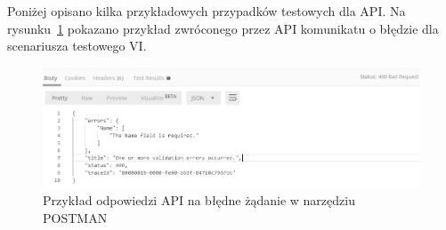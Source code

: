 Poniżej opisano kilka przykładowych przypadków testowych dla API. Na rysunku~\ref{fig:api-test-1} pokazano przykład zwróconego przez API komunikatu o błędzie dla scenariusza testowego VI.
\begin{figure}[t]
	\centering
	\includegraphics[width=.95\linewidth]{rys05/api-error.png}
	\caption{Przykład odpowiedzi API na błędne żądanie w narzędziu POSTMAN}
	\label{fig:api-test-1}
\end{figure}

